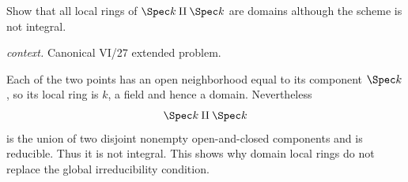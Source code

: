 \begin{problem}\label{prob:vi27-p16}
Show that all local rings of \(\Spec k\amalg\Spec k\) are domains although the scheme is not integral.
\par\smallskip\noindent\textit{context.} Canonical VI/27 extended problem.
\end{problem}

\ifdefined\FullProblemDossiers
\begin{solution}
Each of the two points has an open neighborhood equal to its component \(\Spec k\), so its local ring is \(k\),
a field and hence a domain. Nevertheless
\[
\Spec k\amalg\Spec k
\]
is the union of two disjoint nonempty open-and-closed components and is reducible. Thus it is not integral. This
shows why domain local rings do not replace the global irreducibility condition.
\end{solution}
\fi
